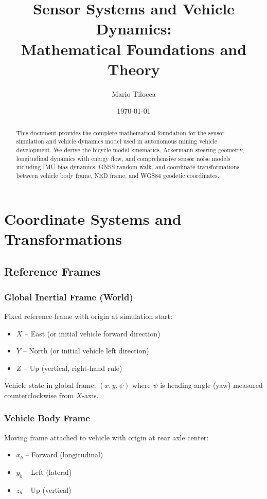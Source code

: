 \documentclass[11pt,a4paper]{article}
\title{Sensor Systems and Vehicle Dynamics:\\
Mathematical Foundations and Theory}
\author{Mario Tilocca}
\date{\today}
\begin{document}
\maketitle

\begin{abstract}
This document provides the complete mathematical foundation for the sensor simulation and vehicle dynamics model used in autonomous mining vehicle development. We derive the bicycle model kinematics, Ackermann steering geometry, longitudinal dynamics with energy flow, and comprehensive sensor noise models including IMU bias dynamics, GNSS random walk, and coordinate transformations between vehicle body frame, NED frame, and WGS84 geodetic coordinates.
\end{abstract}

\section{Coordinate Systems and Transformations}

\subsection{Reference Frames}

\subsubsection{Global Inertial Frame (World)}

Fixed reference frame with origin at simulation start:
\begin{itemize}
    \item $X$ -- East (or initial vehicle forward direction)
    \item $Y$ -- North (or initial vehicle left direction)
    \item $Z$ -- Up (vertical, right-hand rule)
\end{itemize}

Vehicle state in global frame: $(x, y, \psi)$ where $\psi$ is heading angle (yaw) measured counterclockwise from $X$-axis.

\subsubsection{Vehicle Body Frame}

Moving frame attached to vehicle with origin at rear axle center:
\begin{itemize}
    \item $x_b$ -- Forward (longitudinal)
    \item $y_b$ -- Left (lateral)
    \item $z_b$ -- Up (vertical)
\end{itemize}
\end{document}
